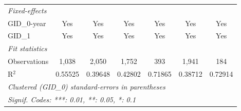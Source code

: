 \begin{table}[H]
\begin{tabular}{lcccccc}
      \midrule
      \emph{Fixed-effects}\\
      GID\_0-year        & Yes                     & Yes                     & Yes                     & Yes                            & Yes                           & Yes\\  
      GID\_1             & Yes                     & Yes                     & Yes                     & Yes                            & Yes                           & Yes\\  
      \midrule
      \emph{Fit statistics}\\
      Observations       & 1,038                   & 2,050                   & 1,752                   & 393                            & 1,941                         & 184\\  
      R$^2$              & 0.55525                 & 0.39648                 & 0.42802                 & 0.71865                        & 0.38712                       & 0.72914\\  
      \midrule \midrule
      \multicolumn{7}{l}{\emph{Clustered (GID\_0) standard-errors in parentheses}}\\
      \multicolumn{7}{l}{\emph{Signif. Codes: ***: 0.01, **: 0.05, *: 0.1}}\\
   \end{tabular}
\end{table}



